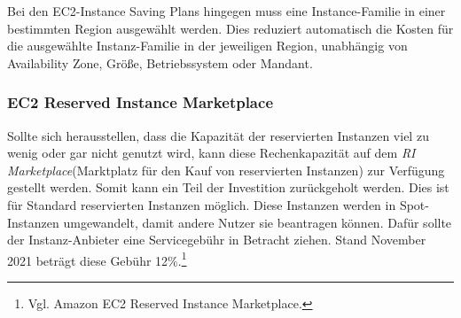 Bei den EC2-Instance Saving Plans hingegen muss eine Instance-Familie in einer bestimmten Region ausgewählt werden.  Dies reduziert automatisch die Kosten für die ausgewählte Instanz-Familie in der jeweiligen Region, unabhängig von Availability Zone, Größe, Betriebssystem oder Mandant.

\subsubsection*{EC2 Reserved Instance Marketplace}\label{sssec:RI-Marketplace}
Sollte sich herausstellen, dass die Kapazität der reservierten Instanzen viel zu wenig oder gar nicht genutzt wird, kann diese Rechenkapazität auf dem \textit{RI Marketplace}(Marktplatz für den Kauf von reservierten Instanzen) zur Verfügung gestellt werden. Somit kann ein Teil der Investition zurückgeholt werden. Dies ist für Standard reservierten Instanzen möglich.
Diese Instanzen werden in Spot-Instanzen umgewandelt, damit andere Nutzer sie beantragen können. Dafür sollte der Instanz-Anbieter eine Servicegebühr in Betracht ziehen. Stand November 2021 beträgt diese Gebühr 12\%.\footnote{Vgl. Amazon EC2 Reserved Instance Marketplace\cite{AMZ23}.}

